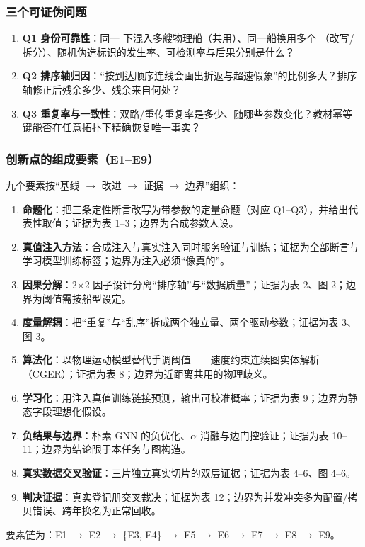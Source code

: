\documentclass[10.5pt,a4paper]{ctexart}
\newcommand{\mmsi}{\text{MMSI}}
\begin{document}
\subsubsection{三个可证伪问题}
\begin{enumerate}[label=（\arabic*）,leftmargin=2.5em]
\item \textbf{Q1 身份可靠性}：同一 \mmsi{} 下混入多艘物理船（共用）、同一船换用多个 \mmsi{}（改写/拆分）、随机伪造标识的发生率、可检测率与后果分别是什么？
\item \textbf{Q2 排序轴归因}：``按到达顺序连线会画出折返与超速假象''的比例多大？排序轴修正后残余多少、残余来自何处？
\item \textbf{Q3 重复率与一致性}：双路/重传重复率是多少、随哪些参数变化？教材幂等键能否在任意拓扑下精确恢复唯一事实？
\end{enumerate}

\subsubsection{创新点的组成要素（E1--E9）}
九个要素按``基线 $\rightarrow$ 改进 $\rightarrow$ 证据 $\rightarrow$ 边界''组织：
\begin{enumerate}[label=\textbf{E\arabic*},leftmargin=3.2em]
\item \textbf{命题化}：把三条定性断言改写为带参数的定量命题（对应 Q1--Q3），并给出代表性取值；证据为表 1--3；边界为合成参数人设。
\item \textbf{真值注入方法}：合成注入与真实注入同时服务验证与训练；证据为全部断言与学习模型训练标签；边界为注入必须``像真的''。
\item \textbf{因果分解}：2$\times$2 因子设计分离``排序轴''与``数据质量''；证据为表 2、图 2；边界为阈值需按船型设定。
\item \textbf{度量解耦}：把``重复''与``乱序''拆成两个独立量、两个驱动参数；证据为表 3、图 3。
\item \textbf{算法化}：以物理运动模型替代手调阈值——速度约束连续图实体解析（CGER）；证据为表 8；边界为近距离共用的物理歧义。
\item \textbf{学习化}：用注入真值训练链接预测，输出可校准概率；证据为表 9；边界为静态字段理想化假设。
\item \textbf{负结果与边界}：朴素 GNN 的负优化、$\alpha$ 消融与边门控验证；证据为表 10--11；边界为结论限于本任务与图构造。
\item \textbf{真实数据交叉验证}：三片独立真实切片的双层证据；证据为表 4--6、图 4--6。
\item \textbf{判决证据}：真实登记册交叉裁决；证据为表 12；边界为并发冲突多为配置/拷贝错误、跨年换名为正常回收。
\end{enumerate}
要素链为：E1 $\rightarrow$ E2 $\rightarrow$ \{E3, E4\} $\rightarrow$ E5 $\rightarrow$ E6 $\rightarrow$ E7 $\rightarrow$ E8 $\rightarrow$ E9。
\end{document}
